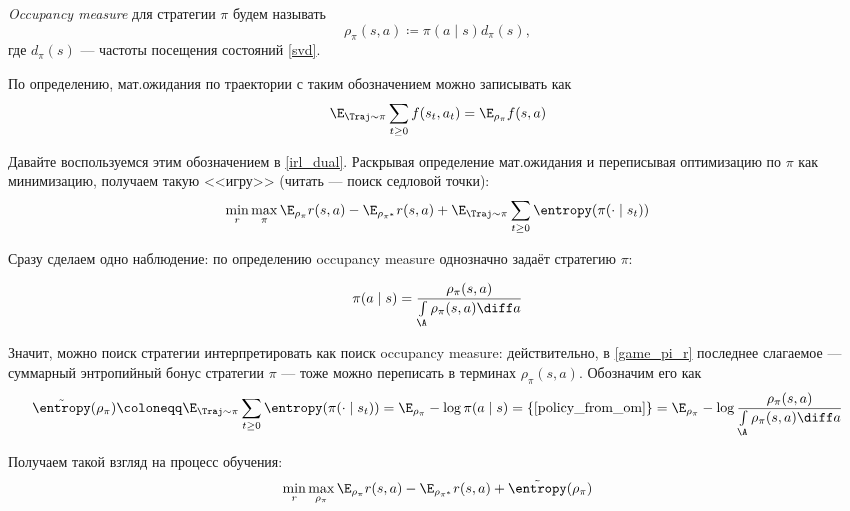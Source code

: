 \begin{definition}
\emph{Occupancy measure} для стратегии $\pi$ будем называть
\begin{equation}\label{occupancymeasure}
\rho_\pi(s, a) \coloneqq \pi(a \mid s)d_{\pi}(s),
\end{equation}
где $d_\pi(s)$ --- частоты посещения состояний \eqref{svd}.
\end{definition}

По определению, мат.ожидания по траектории с таким обозначением можно записывать как
$$\E_{\Traj \sim \pi} \sum_{t \ge 0} f(s_t, a_t) = \E_{\rho_{\pi}} f(s, a)$$

Давайте воспользуемся этим обозначением в \eqref{irl_dual}. Раскрывая определение мат.ожидания и переписывая оптимизацию по $\pi$ как минимизацию, получаем такую <<игру>> (читать --- поиск седловой точки):
\begin{equation}\label{game_pi_r}
\min\limits_{r} \max\limits_{\pi} \E_{\rho_{\pi}} r(s, a) - \E_{\rho_{\pi^*}} r(s, a) + \E_{\Traj \sim \pi} \sum_{t \ge 0} \entropy(\pi(\cdot \mid s_t))
\end{equation}

Сразу сделаем одно наблюдение: по определению occupancy measure однозначно задаёт стратегию $\pi$:

\begin{proposition}
\begin{equation}\label{policy_from_om}
\pi(a \mid s) = \frac{\rho_\pi(s, a)}{\int\limits_{\A} \rho_\pi(s, a) \diff a}
\end{equation}
\end{proposition}

Значит, можно поиск стратегии интерпретировать как поиск occupancy measure: действительно, в \eqref{game_pi_r} последнее слагаемое --- суммарный энтропийный бонус стратегии $\pi$ --- тоже можно переписать в терминах $\rho_\pi(s, a)$. Обозначим его как
$$\tilde{\entropy}(\rho_\pi) \coloneqq \E_{\Traj \sim \pi} \sum_{t \ge 0} \entropy(\pi(\cdot \mid s_t)) = \E_{\rho_\pi} -\log \pi(a \mid s) = \{ \text{\eqref{policy_from_om}} \} = \E_{\rho_\pi} -\log \frac{\rho_\pi(s, a)}{\int\limits_{\A} \rho_\pi(s, a) \diff a}$$

Получаем такой взгляд на процесс обучения:
\begin{equation}\label{game_pi_rho}
\min\limits_{r} \max\limits_{\rho_\pi} \E_{\rho_{\pi}} r(s, a) - \E_{\rho_{\pi^*}} r(s, a) + \tilde{\entropy}(\rho_\pi)
\end{equation}


